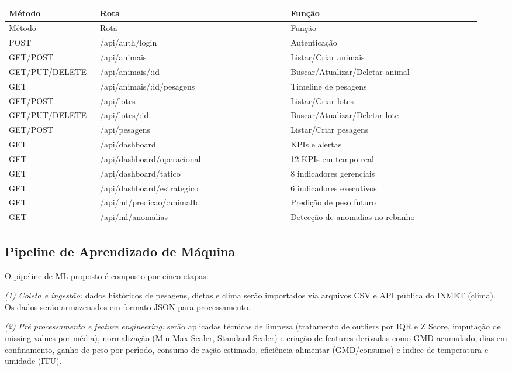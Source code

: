 \documentclass[12pt,a4paper]{article}
\begin{document}
\begin{longtable}{p{0.18\linewidth} p{0.38\linewidth} p{0.38\linewidth}}
\toprule
M\'etodo & Rota & Fun\c c\~ao \\
\midrule
\endfirsthead
\toprule
M\'etodo & Rota & Fun\c c\~ao \\
\midrule
\endhead
POST & /api/auth/login & Autentica\c c\~ao \\
GET/POST & /api/animais & Listar/Criar animais \\
GET/PUT/DELETE & /api/animais/:id & Buscar/Atualizar/Deletar animal \\
GET & /api/animais/:id/pesagens & Timeline de pesagens \\
GET/POST & /api/lotes & Listar/Criar lotes \\
GET/PUT/DELETE & /api/lotes/:id & Buscar/Atualizar/Deletar lote \\
GET/POST & /api/pesagens & Listar/Criar pesagens \\
GET & /api/dashboard & KPIs e alertas \\
GET & /api/dashboard/operacional & 12 KPIs em tempo real \\
GET & /api/dashboard/tatico & 8 indicadores gerenciais \\
GET & /api/dashboard/estrategico & 6 indicadores executivos \\
GET & /api/ml/predicao/:animalId & Predi\c c\~ao de peso futuro \\
GET & /api/ml/anomalias & Detec\c c\~ao de anomalias no rebanho \\
\bottomrule
\end{longtable}

\subsection{Pipeline de Aprendizado de M\'aquina}

O pipeline de ML proposto \'e composto por cinco etapas:

\textit{(1) Coleta e ingest\~ao:} dados hist\'oricos de pesagens, dietas e clima ser\~ao importados via arquivos CSV e API p\'ublica do INMET (clima). Os dados ser\~ao armazenados em formato JSON para processamento.

\textit{(2) Pr\'e processamento e feature engineering:} ser\~ao aplicadas t\'ecnicas de limpeza (tratamento de outliers por IQR e Z Score, imputa\c c\~ao de missing values por m\'edia), normaliza\c c\~ao (Min Max Scaler, Standard Scaler) e cria\c c\~ao de features derivadas como GMD acumulado, dias em confinamento, ganho de peso por per\'{\i}odo, consumo de ra\c c\~ao estimado, efici\^encia alimentar (GMD/consumo) e \'{\i}ndice de temperatura e umidade (ITU).
\end{document}
